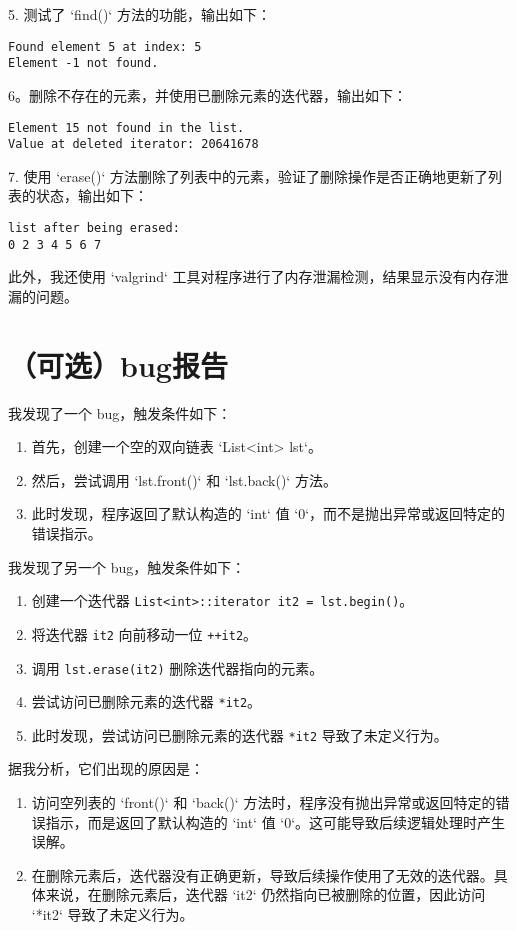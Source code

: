 \documentclass[UTF8]{ctexart}
\begin{document}
5. 测试了 `find()` 方法的功能，输出如下：
\begin{verbatim}
Found element 5 at index: 5
Element -1 not found.
\end{verbatim}

6。删除不存在的元素，并使用已删除元素的迭代器，输出如下：
\begin{verbatim}
Element 15 not found in the list.
Value at deleted iterator: 20641678
\end{verbatim}

7. 使用 `erase()` 方法删除了列表中的元素，验证了删除操作是否正确地更新了列表的状态，输出如下：
\begin{verbatim}
list after being erased:
0 2 3 4 5 6 7 
\end{verbatim}

此外，我还使用 `valgrind` 工具对程序进行了内存泄漏检测，结果显示没有内存泄漏的问题。

\section{（可选）bug报告}

我发现了一个 bug，触发条件如下：

\begin{enumerate}  
    \item 首先，创建一个空的双向链表 `List<int> lst`。  
    \item 然后，尝试调用 `lst.front()` 和 `lst.back()` 方法。  
    \item 此时发现，程序返回了默认构造的 `int` 值 `0`，而不是抛出异常或返回特定的错误指示。  
\end{enumerate}  

我发现了另一个 bug，触发条件如下：

\begin{enumerate}  
    \item 创建一个迭代器 \texttt{List<int>::iterator it2 = lst.begin()}。
    \item 将迭代器 \texttt{it2} 向前移动一位 \texttt{++it2}。
    \item 调用 \texttt{lst.erase(it2)} 删除迭代器指向的元素。
    \item 尝试访问已删除元素的迭代器 \texttt{*it2}。
    \item 此时发现，尝试访问已删除元素的迭代器 \texttt{*it2} 导致了未定义行为。
\end{enumerate}  

据我分析，它们出现的原因是：

\begin{enumerate}
    \item 访问空列表的 `front()` 和 `back()` 方法时，程序没有抛出异常或返回特定的错误指示，而是返回了默认构造的 `int` 值 `0`。这可能导致后续逻辑处理时产生误解。
    
    \item 在删除元素后，迭代器没有正确更新，导致后续操作使用了无效的迭代器。具体来说，在删除元素后，迭代器 `it2` 仍然指向已被删除的位置，因此访问 `*it2` 导致了未定义行为。

\end{enumerate}
\end{document}
